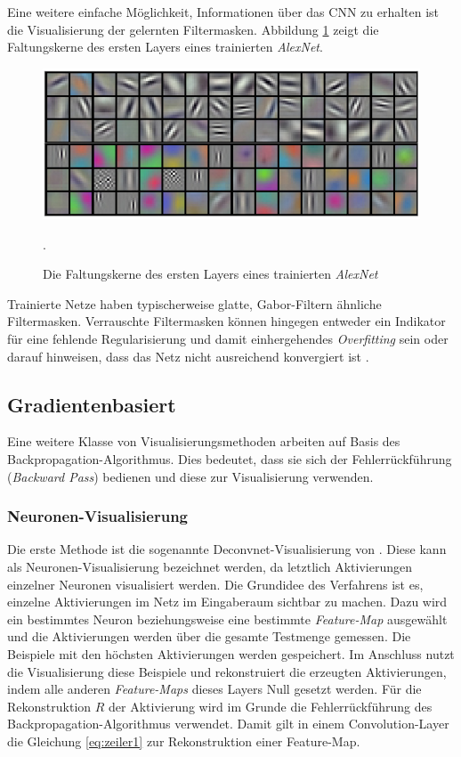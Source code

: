 Eine weitere einfache Möglichkeit, Informationen über das CNN zu erhalten ist die Visualisierung der gelernten Filtermasken. Abbildung \ref{fig:4_kernel} zeigt die Faltungskerne des ersten Layers eines trainierten \textit{AlexNet}. 

\begin{figure}[H]
\centering
\includegraphics[width=0.5\linewidth]{images/4_kernel}
\caption[]{Die Faltungskerne des ersten Layers eines trainierten \textit{AlexNet}  \cite[siehe][]{Krizhevsky2012}}.
\label{fig:4_kernel}
\end{figure}

Trainierte Netze haben typischerweise glatte, Gabor-Filtern ähnliche Filtermasken. Verrauschte Filtermasken können hingegen entweder ein Indikator für eine fehlende Regularisierung und damit einhergehendes \textit{Overfitting} sein oder darauf hinweisen, dass das Netz nicht ausreichend konvergiert ist \cite[vgl.][]{Kaparthy2014}.     


\subsection{Gradientenbasiert}

Eine weitere Klasse von Visualisierungsmethoden arbeiten auf Basis des Backpropagation-Algorithmus. Dies bedeutet, dass sie sich der Fehler\-rück\-führung (\textit{Backward Pass}) bedienen und diese zur Visualisierung verwenden.

\subsubsection{Neuronen-Visualisierung}
Die erste Methode ist die sogenannte Deconvnet-Visualisierung von \cite{Zeiler2014}. Diese kann als Neuronen-Visualisierung bezeichnet werden, da letztlich Aktivierungen einzelner Neuronen visualisiert werden. Die Grundidee des Verfahrens ist es, einzelne Aktivierungen im Netz im Eingaberaum sichtbar zu machen. Dazu wird ein bestimmtes Neuron beziehungsweise eine bestimmte \textit{Feature-Map} ausgewählt und die Aktivierungen werden über die gesamte Testmenge gemessen. Die Beispiele mit den höchsten Aktivierungen werden gespeichert. Im Anschluss nutzt die Visualisierung diese Beispiele und rekonstruiert die erzeugten Aktivierungen, indem alle anderen \textit{Feature-Maps} dieses Layers Null gesetzt werden. Für die Rekonstruktion $R$ der Aktivierung wird im Grunde die Fehlerrückführung des Backpropagation-Algorithmus verwendet. Damit gilt in einem Convolution-Layer die Gleichung \ref{eq:zeiler1} zur Rekonstruktion einer Feature-Map.

